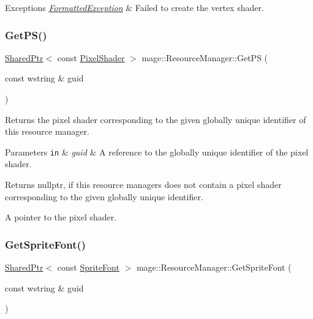 \begin{DoxyExceptions}{Exceptions}
{\em \hyperlink{classmage_1_1_formatted_exception}{Formatted\+Exception}} & Failed to create the vertex shader. \\
\hline
\end{DoxyExceptions}
\hypertarget{classmage_1_1_resource_manager_acf32120f85d46e82d2ddcfc8fe66bea7}{}\label{classmage_1_1_resource_manager_acf32120f85d46e82d2ddcfc8fe66bea7} 
\subsubsection{\texorpdfstring{Get\+P\+S()}{GetPS()}}
{\footnotesize\ttfamily \hyperlink{namespacemage_a1e01ae66713838a7a67d30e44c67703e}{Shared\+Ptr}$<$ const \hyperlink{namespacemage_a27ecaf266420ee7a494d64edc0757129}{Pixel\+Shader} $>$ mage\+::\+Resource\+Manager\+::\+Get\+PS (\begin{DoxyParamCaption}\item[{const wstring \&}]{guid }\end{DoxyParamCaption})\hspace{0.3cm}{\ttfamily [noexcept]}}

Returns the pixel shader corresponding to the given globally unique identifier of this resource manager.


\begin{DoxyParams}[1]{Parameters}
\mbox{\tt in}  & {\em guid} & A reference to the globally unique identifier of the pixel shader. \\
\hline
\end{DoxyParams}
\begin{DoxyReturn}{Returns}
{\ttfamily nullptr}, if this resource managers does not contain a pixel shader corresponding to the given globally unique identifier. 

A pointer to the pixel shader. 
\end{DoxyReturn}
\hypertarget{classmage_1_1_resource_manager_a09d440829037d0469a35ce48ae9ecaee}{}\label{classmage_1_1_resource_manager_a09d440829037d0469a35ce48ae9ecaee} 
\subsubsection{\texorpdfstring{Get\+Sprite\+Font()}{GetSpriteFont()}}
{\footnotesize\ttfamily \hyperlink{namespacemage_a1e01ae66713838a7a67d30e44c67703e}{Shared\+Ptr}$<$ const \hyperlink{classmage_1_1_sprite_font}{Sprite\+Font} $>$ mage\+::\+Resource\+Manager\+::\+Get\+Sprite\+Font (\begin{DoxyParamCaption}\item[{const wstring \&}]{guid }\end{DoxyParamCaption})\hspace{0.3cm}{\ttfamily [noexcept]}}

